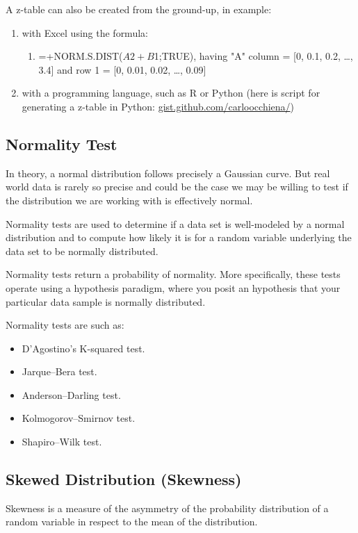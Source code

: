 \documentclass{article}
\begin{document}
A z-table can also be created from the ground-up, in example: 
\begin{enumerate}
    \item with Excel using the formula:
    \begin{enumerate}
        \item =+NORM.S.DIST($A2+B$1;TRUE), having "A" column = [0, 0.1, 0.2, …, 3.4] and row 1 = [0, 0.01, 0.02, …, 0.09]
    \end{enumerate}
    \item with a programming language, such as R or Python (here is script for generating a z-table in Python: \href{https://gist.github.com/carloocchiena/f65e1381a30004352561a606ee0ba51a}{gist.github.com/carloocchiena/})
\end{enumerate}

\subsection{Normality Test}
In theory, a normal distribution follows precisely a Gaussian curve. But real world data is rarely so precise and could be the case we may be willing to test if the distribution we are working with is effectively normal.

Normality tests are used to determine if a data set is well-modeled by a normal distribution and to compute how likely it is for a random variable underlying the data set to be normally distributed. 

Normality tests return a probability of normality. More specifically, these tests operate using a hypothesis paradigm, where you posit an hypothesis that your particular data sample is normally distributed. 

Normality tests are such as:
\begin{itemize}
    \item D'Agostino's K-squared test.
    \item Jarque–Bera test.
    \item Anderson–Darling test.
    \item Kolmogorov–Smirnov test.
    \item Shapiro–Wilk test.
\end{itemize}

\subsection{Skewed Distribution (Skewness)}
Skewness is a measure of the asymmetry of the probability distribution of a random variable in respect to the mean of the distribution. 
\end{document}
